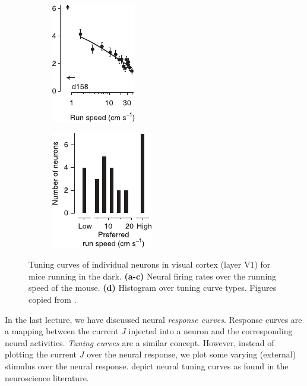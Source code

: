 \documentclass[10pt,letterpaper,oneside]{article}
\begin{document}
\begin{figure}[p]
\begin{subfigure}[b]{0.25\textwidth}
		\centering%
		\hspace{-1cm}\includegraphics[scale=1.4]{media/saleem_et_al_tuning_curves_c.pdf}%
		\caption{}%
		\label{fig:saleem_et_al_tuning_curves_c}%
	\end{subfigure}%
	\begin{subfigure}[b]{0.25\textwidth}%
		\centering%
		\hspace{-1cm}\includegraphics[scale=1.4]{media/saleem_et_al_tuning_curves_d.pdf}%
		\caption{}%
		\label{fig:saleem_et_al_tuning_curves_d}%
	\end{subfigure}%
	\caption{Tuning curves of individual neurons in visual cortex (layer V1) for mice running in the dark. \textbf{(a-c)} Neural firing rates over the running speed of the mouse. \textbf{(d)} Histogram over tuning curve types. Figures copied from \cite{saleem2013integration}.}
	\label{fig:tuning_curves_2}
\end{figure}

In the last lecture, we have discussed neural \emph{response curves}. Response curves are a mapping between the current $J$ injected into a neuron and the corresponding neural activities. \emph{Tuning curves} are a similar concept. However, instead of plotting the current $J$ over the neural response, we plot some varying (external) stimulus over the neural response.  depict neural tuning curves as found in the neuroscience literature.

\end{document}
